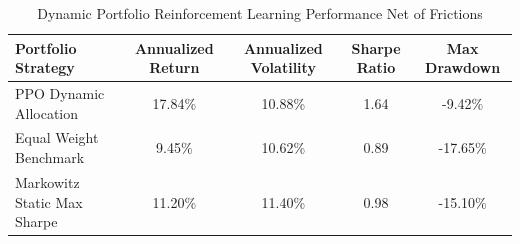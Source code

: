 \begin{table}[h!]
\centering
\caption{Dynamic Portfolio Reinforcement Learning Performance Net of Frictions}
\label{tab:rl_perf}
\begin{tabular}{lcccc}
\toprule
\textbf{Portfolio Strategy} & \textbf{Annualized Return} & \textbf{Annualized Volatility} & \textbf{Sharpe Ratio} & \textbf{Max Drawdown} \\
\midrule
PPO Dynamic Allocation & 17.84\% & 10.88\% & 1.64 & -9.42\% \\
Equal Weight Benchmark & 9.45\% & 10.62\% & 0.89 & -17.65\% \\
Markowitz Static Max Sharpe & 11.20\% & 11.40\% & 0.98 & -15.10\% \\
\bottomrule
\end{tabular}
\end{table}
